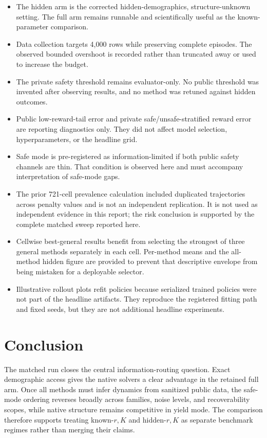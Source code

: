 \documentclass[11pt]{article}
\begin{document}
\begin{itemize}
    \item The hidden arm is the corrected hidden-demographics,
    structure-unknown setting.  The full arm remains runnable and scientifically
    useful as the known-parameter comparison.
    \item Data collection targets 4,000 rows while preserving complete
    episodes.  The observed bounded overshoot is recorded rather than
    truncated away or used to increase the budget.
    \item The private safety threshold remains evaluator-only.  No public
    threshold was invented after observing results, and no method was retuned
    against hidden outcomes.
    \item Public low-reward-tail error and private safe/unsafe-stratified
    reward error are reporting diagnostics only.  They did not affect model
    selection, hyperparameters, or the headline grid.
    \item Safe mode is pre-registered as information-limited if both public
    safety channels are thin.  That condition is observed here and must
    accompany interpretation of safe-mode gaps.
    \item The prior 721-cell prevalence calculation included duplicated
    trajectories across penalty values and is not an independent replication.
    It is not used as independent evidence in this report; the risk conclusion
    is supported by the complete matched sweep reported here.
    \item Cellwise best-general results benefit from selecting the strongest
    of three general methods separately in each cell.  Per-method means and
    the all-method hidden figure are provided to prevent that descriptive
    envelope from being mistaken for a deployable selector.
    \item Illustrative rollout plots refit policies because serialized trained
    policies were not part of the headline artifacts.  They reproduce the
    registered fitting path and fixed seeds, but they are not additional
    headline experiments.
\end{itemize}

\section{Conclusion}

The matched run closes the central information-routing question.  Exact
demographic access gives the native solvers a clear advantage in the retained
full arm.  Once all methods must infer dynamics from sanitized public data,
the safe-mode ordering reverses broadly across families, noise levels, and
recoverability scopes, while native structure remains competitive in yield
mode.  The comparison therefore supports treating known-$r,K$ and hidden-$r,K$
as separate benchmark regimes rather than merging their claims.
\end{document}
